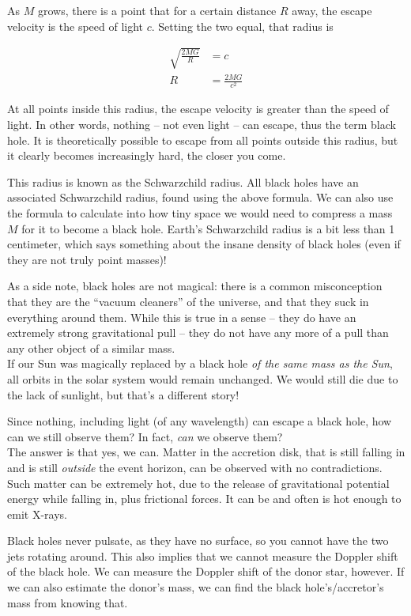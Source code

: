 As $M$ grows, there is a point that for a certain distance $R$ away, the escape velocity is the speed of light $c$. Setting the two equal, that radius is

\begin{align}
\sqrt{\frac{2 M G}{R}} &= c\\
R &= \frac{2 M G}{c^2}
\end{align}

At all points inside this radius, the escape velocity is greater than the speed of light. In other words, nothing -- not even light -- can escape, thus the term black hole. It is theoretically possible to escape from all points outside this radius, but it clearly becomes increasingly hard, the closer you come.

This radius is known as the Schwarzchild radius. All black holes have an associated Schwarzchild radius, found using the above formula. We can also use the formula to calculate into how tiny space we would need to compress a mass $M$ for it to become a black hole. Earth's Schwarzchild radius is a bit less than 1 centimeter, which says something about the insane density of black holes (even if they are not truly point masses)!

As a side note, black holes are not magical: there is a common misconception that they are the ``vacuum cleaners'' of the universe, and that they suck in everything around them. While this is true in a sense -- they do have an extremely strong gravitational pull -- they do not have any more of a pull than any other object of a similar mass.\\
If our Sun was magically replaced by a black hole \emph{of the same mass as the Sun}, all orbits in the solar system would remain unchanged. We would still die due to the lack of sunlight, but that's a different story!

Since nothing, including light (of any wavelength) can escape a black hole, how can we still observe them? In fact, \emph{can} we observe them?\\
The answer is that yes, we can. Matter in the accretion disk, that is still falling in and is still \emph{outside} the event horizon, can be observed with no contradictions. Such matter can be extremely hot, due to the release of gravitational potential energy while falling in, plus frictional forces. It can be and often is hot enough to emit X-rays.

Black holes never pulsate, as they have no surface, so you cannot have the two jets rotating around. This also implies that we cannot measure the Doppler shift of the black hole. We can measure the Doppler shift of the donor star, however. If we can also estimate the donor's mass, we can find the black hole's/accretor's mass from knowing that.


